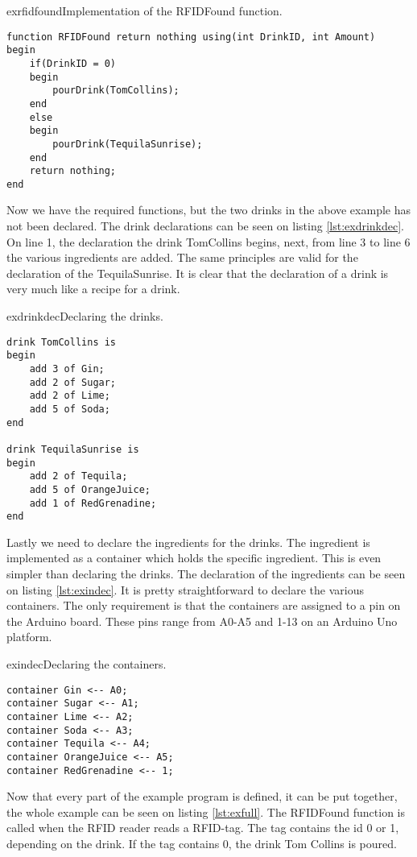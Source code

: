 \begin{code}{exrfidfound}{Implementation of the RFIDFound function.}
\begin{lstlisting}
function RFIDFound return nothing using(int DrinkID, int Amount)
begin
	if(DrinkID = 0)
	begin
		pourDrink(TomCollins);
	end
	else
	begin
		pourDrink(TequilaSunrise);
	end
	return nothing;
end
\end{lstlisting}
\end{code}

Now we have the required functions, but the two drinks in the above example has not been declared. The drink declarations can be seen on listing \ref{lst:exdrinkdec}. On line 1, the declaration the drink TomCollins begins, next, from line 3 to line 6 the various ingredients are added. The same principles are valid for the declaration of the TequilaSunrise. It is clear that the declaration of a drink is very much like a recipe for a drink. 

\begin{code}{exdrinkdec}{Declaring the drinks.}
\begin{lstlisting}
drink TomCollins is
begin
	add 3 of Gin;
	add 2 of Sugar;
	add 2 of Lime;
	add 5 of Soda;
end

drink TequilaSunrise is 
begin
	add 2 of Tequila;
	add 5 of OrangeJuice;
	add 1 of RedGrenadine;
end
\end{lstlisting}
\end{code}

Lastly we need to declare the ingredients for the drinks. The ingredient is implemented as a container which holds the specific ingredient. This is even simpler than declaring the drinks. The declaration of the ingredients can be seen on listing \ref{lst:exindec}. It is pretty straightforward to declare the various containers. The only requirement is that the containers are assigned to a pin on the Arduino board. These pins range from A0-A5 and 1-13 on an Arduino Uno platform.

\begin{code}{exindec}{Declaring the containers.}
\begin{lstlisting}
container Gin <-- A0;
container Sugar <-- A1;
container Lime <-- A2;
container Soda <-- A3;
container Tequila <-- A4;
container OrangeJuice <-- A5;
container RedGrenadine <-- 1;
\end{lstlisting}
\end{code}

Now that every part of the example program is defined, it can be put together, the whole example can be seen on listing \ref{lst:exfull}. The RFIDFound function is called when the RFID reader reads a RFID-tag. The tag contains the id 0 or 1, depending on the drink. If the tag contains 0, the drink Tom Collins is poured. 

